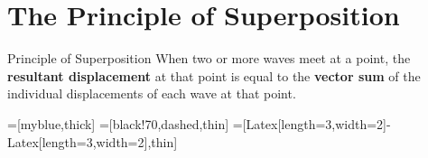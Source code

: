 

\section{The Principle of Superposition}

\begin{definitionbox}{Principle of Superposition}
When two or more waves meet at a point, the \textbf{resultant displacement} at that point is equal to the \textbf{vector sum} of the individual displacements of each wave at that point.
\end{definitionbox}

\vspace{6em}


=[myblue,thick]
=[black!70,dashed,thin]
=[{Latex[length=3,width=2]}-{Latex[length=3,width=2]},thin]





\def\A{0.5}
\def\k{360}
\def\xmin{-0.3}
\def\xmax{4.4}
\def\h{2.3}
\def\lang{90}
\def\rang{270} %
\def\nsamples{200}


